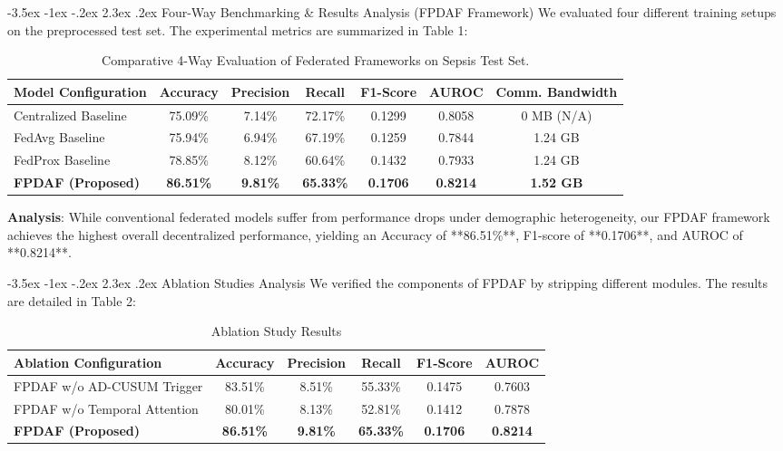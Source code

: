 \documentclass[11pt, a4paper]{article}
\makeatletter
\renewcommand\section{\@startsection {section}{1}{\z@}%
                                   {-3.5ex \@plus -1ex \@minus -.2ex}%
                                   {2.3ex \@plus.2ex}%
                                   {\normalfont\large\bfseries\color{amritaMaroon}}}
\makeatother
\begin{document}
\section{Four-Way Benchmarking \& Results Analysis (FPDAF Framework)}
We evaluated four different training setups on the preprocessed test set. The experimental metrics are summarized in Table 1:

\begin{table}[H]
\centering
\small
\renewcommand{\arraystretch}{1.2}
\begin{tabular}{|l|c|c|c|c|c|c|}
\hline
\textbf{Model Configuration} & \textbf{Accuracy} & \textbf{Precision} & \textbf{Recall} & \textbf{F1-Score} & \textbf{AUROC} & \textbf{Comm. Bandwidth} \\
\hline
Centralized Baseline & 75.09\% & 7.14\% & 72.17\% & 0.1299 & 0.8058 & 0 MB (N/A) \\
FedAvg Baseline & 75.94\% & 6.94\% & 67.19\% & 0.1259 & 0.7844 & 1.24 GB \\
FedProx Baseline & 78.85\% & 8.12\% & 60.64\% & 0.1432 & 0.7933 & 1.24 GB \\
\textbf{FPDAF (Proposed)} & \textbf{86.51\%} & \textbf{9.81\%} & \textbf{65.33\%} & \textbf{0.1706} & \textbf{0.8214} & \textbf{1.52 GB} \\
\hline
\end{tabular}
\caption{Comparative 4-Way Evaluation of Federated Frameworks on Sepsis Test Set.}
\end{table}

\textbf{Analysis}: While conventional federated models suffer from performance drops under demographic heterogeneity, our FPDAF framework achieves the highest overall decentralized performance, yielding an Accuracy of **86.51\%**, F1-score of **0.1706**, and AUROC of **0.8214**.

\section{Ablation Studies Analysis}
We verified the components of FPDAF by stripping different modules. The results are detailed in Table 2:

\begin{table}[H]
\centering
\small
\renewcommand{\arraystretch}{1.2}
\begin{tabular}{|l|c|c|c|c|c|}
\hline
\textbf{Ablation Configuration} & \textbf{Accuracy} & \textbf{Precision} & \textbf{Recall} & \textbf{F1-Score} & \textbf{AUROC} \\
\hline
FPDAF w/o AD-CUSUM Trigger & 83.51\% & 8.51\% & 55.33\% & 0.1475 & 0.7603 \\
FPDAF w/o Temporal Attention & 80.01\% & 8.13\% & 52.81\% & 0.1412 & 0.7878 \\
\textbf{FPDAF (Proposed)} & \textbf{86.51\%} & \textbf{9.81\%} & \textbf{65.33\%} & \textbf{0.1706} & \textbf{0.8214} \\
\hline
\end{tabular}
\caption{Ablation Study Results}
\end{table}
\end{document}
